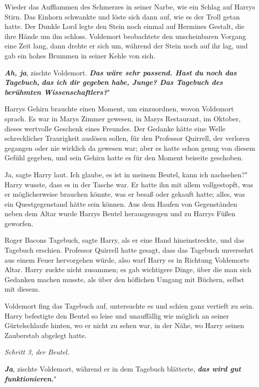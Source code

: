 Wieder das Aufflammen des Schmerzes in seiner Narbe, wie ein Schlag auf Harrys
Stirn. Das Einhorn schwankte und löste sich dann auf, wie es der Troll getan
hatte. Der Dunkle Lord legte den Stein noch einmal auf Hermines Gestalt, die
ihre Hände um ihn schloss. Voldemort beobachtete den unscheinbaren Vorgang eine
Zeit lang, dann drehte er sich um, während der Stein noch auf ihr lag, und gab
ein hohes Brummen in seiner Kehle von sich.

\glqq \textbf{\emph{Ah, ja}}\grqq{}, zischte Voldemort. \glqq \textbf{\emph{Das
wäre sehr passend. Hast du noch das Tagebuch, }}\textbf{\emph{das ich dir
gegeben habe, Junge? Das Tagebuch des berühmten Wissenschaftlers?}}"

Harrys Gehirn brauchte einen Moment, um einzuordnen, wovon Voldemort sprach. Es
war in Marys Zimmer gewesen, in Marys Restaurant, im Oktober, dieses wertvolle
Geschenk eines Freundes. Der Gedanke hätte eine Welle schrecklicher Traurigkeit
auslösen sollen, für den Professor Quirrell, der verloren gegangen oder nie
wirklich da gewesen war; aber es hatte schon genug von diesem Gefühl gegeben,
und sein Gehirn hatte es für den Moment beiseite geschoben.

\glqq Ja\grqq{}, sagte Harry laut. \glqq Ich glaube, es ist in meinem Beutel,
kann ich nachsehen?" Harry wusste, dass es in der Tasche war. Er hatte ihn mit
allem vollgestopft, was er möglicherweise brauchen könnte, was er besaß oder
gekauft hatte; alles, was ein Questgegenstand hätte sein können. Aus dem Haufen
von Gegenständen neben dem Altar wurde Harrys Beutel herausgezogen und zu Harrys
Füßen geworfen.

\glqq Roger Bacons Tagebuch\grqq{}, sagte Harry, als er eine Hand
hineinstreckte, und das Tagebuch erschien. Professor Quirrell hatte gesagt, dass
das Tagebuch unversehrt aus einem Feuer hervorgehen würde, also warf Harry es in
Richtung Voldemorts Altar. Harry zuckte nicht zusammen; es gab wichtigere Dinge,
über die man sich Gedanken machen musste, als über den höflichen Umgang mit
Büchern, selbst mit diesem.

Voldemort fing das Tagebuch auf, untersuchte es und schien ganz vertieft zu
sein. Harry befestigte den Beutel so leise und unauffällig wie möglich an seiner
Gürtelschlaufe hinten, wo er nicht zu sehen war, in der Nähe, wo Harry seinen
Zauberstab abgelegt hatte.

\emph{Schritt 3, der Beutel.}

\glqq \textbf{\emph{Ja}}\grqq{}, zischte Voldemort, während er in dem Tagebuch
blätterte, \glqq \textbf{\emph{das wird gut funktionieren.}}"

